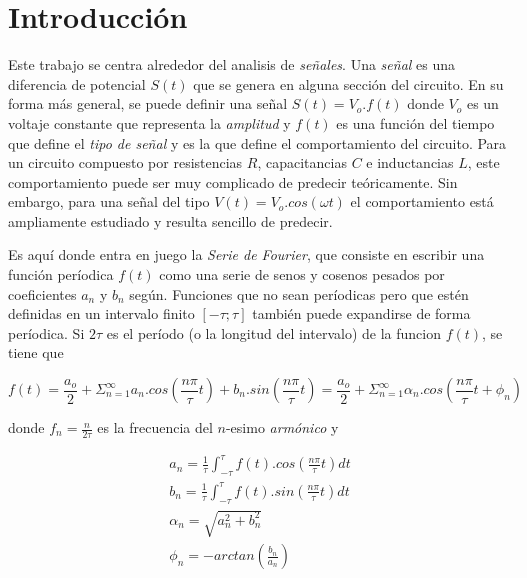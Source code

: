 \documentclass[11pt,a4paper]{article}
\begin{document}
\section{Introducción}\label{sec:intro}
Este trabajo se centra alrededor del analisis de \textit{señales}. Una \textit{señal} es una diferencia de potencial $S(t)$ que se genera en alguna sección del circuito. En su forma más general, se puede definir una señal $S(t) = V_o.f(t)$ donde $V_o$ es un voltaje constante que representa la \textit{amplitud} y $f(t)$ es una función del tiempo que define el \textit{tipo de señal} y es la que define el comportamiento del circuito. Para un circuito compuesto por resistencias $R$, capacitancias $C$ e inductancias $L$, este comportamiento puede ser muy complicado de predecir teóricamente. Sin embargo, para una señal del tipo $V(t) = V_o.cos(\omega t)$ el comportamiento está ampliamente estudiado y resulta sencillo de predecir. 

Es aquí donde entra en juego la \textit{Serie de Fourier}, que consiste en escribir una función períodica $f(t)$ como una serie de senos y cosenos pesados por coeficientes $a_n$ y $b_n$ según. Funciones que no sean períodicas pero que estén definidas en un intervalo finito $[-\tau;\tau]$ también puede expandirse de forma períodica. Si $2\tau$ es el período (o la longitud del intervalo) de la funcion $f(t)$, se tiene que

\begin{equation}
f(t) = \frac{a_o}{2} + \Sigma_{n=1}^{\infty} a_n.cos(\frac{n\pi}{\tau}t) + b_n.sin(\frac{n\pi}{\tau}t) = \frac{a_o}{2} + \Sigma_{n=1}^{\infty} \alpha_n.cos(\frac{n\pi}{\tau}t+\phi_n)
\label{eq:fourier}
\end{equation}

donde $f_n = \frac{n}{2\tau}$ es la frecuencia del $n$-esimo \textit{armónico} y 

\begin{equation}
\begin{split}
a_n = \frac{1}{\tau}\int_{-\tau}^{\tau}f(t).cos(\frac{n\pi}{\tau}t)dt\\
b_n = \frac{1}{\tau}\int_{-\tau}^{\tau}f(t).sin(\frac{n\pi}{\tau}t)dt\\
\alpha_n = \sqrt{a_n^2+b_n^2}\\
\phi_n = -arctan(\frac{b_n}{a_n})
\end{split}
\label{eq:coefs}
\end{equation}
\end{document}
